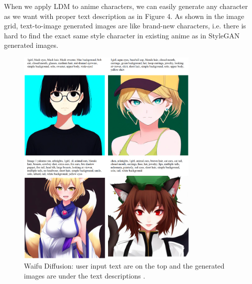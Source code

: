 When we apply LDM to anime characters,
we can easily generate any character as we want with proper text description as in Figure 4.
As shown in the image grid,
text-to-image generated images are like brand-new characters,
i.e. there is hard to find the exact same style character in existing anime as in StyleGAN generated images.
\begin{figure}[h]
    \begin{center}
    \includegraphics[width=0.78\textwidth]{img/waifu_diffusion.png}
    \end{center}
    \caption{
        Waifu Diffusion:
        user input text are on the top
        and the generated images are under the text descriptions \cite{WaifuDiffusion}.
    }
\end{figure}